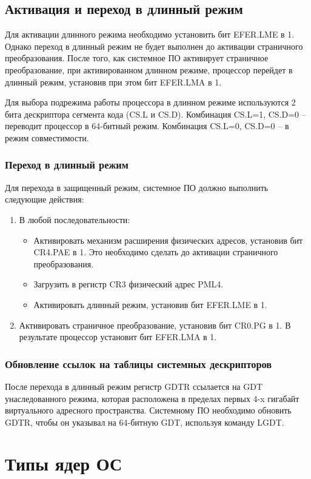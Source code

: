 \subsection{Активация и переход в длинный режим}
Для активации длинного режима необходимо установить бит EFER.LME в 1. Однако переход в длинный режим
не будет выполнен до активации страничного преобразования. После того, как системное ПО
активирует страничное преобразование, при активированном длинном режиме, процессор перейдет в
длинный режим, установив при этом бит EFER.LMA в 1.

Для выбора подрежима работы процессора в длинном режиме используются 2 бита дескриптора сегмента кода (CS.L и CS.D).
Комбинация CS.L=1, CS.D=0 -- переводит процессор в 64-битный режим. Комбинация CS.L=0, CS.D=0 -- в
режим совместимости.

\subsubsection*{Переход в длинный режим}
Для перехода в защищенный режим, системное ПО должно выполнить следующие действия:
\begin{enumerate}[1.]
\item В любой последовательности:
	\begin{itemize}
	\item Активировать механизм расширения физических адресов, установив бит CR4.PAE в 1. Это
		необходимо сделать до активации страничного преобразования.
	\item Загрузить в регистр CR3 физический адрес PML4.
	\item Активировать длинный режим, установив бит EFER.LME в 1.
	\end{itemize}
\item Активировать страничное преобразование, установив бит CR0.PG в 1. В результате процессор установит бит EFER.LMA в 1.
\end{enumerate}

\subsubsection*{Обновление ссылок на таблицы системных дескрипторов}
После перехода в длинный режим регистр GDTR ссылается на GDT унаследованного режима, которая расположена
в пределах первых 4-x гигабайт виртуального адресного пространства. Системному ПО необходимо обновить GDTR,
чтобы он указывал на 64-битную GDT, используя команду LGDT.


\section{Типы ядер ОС}
